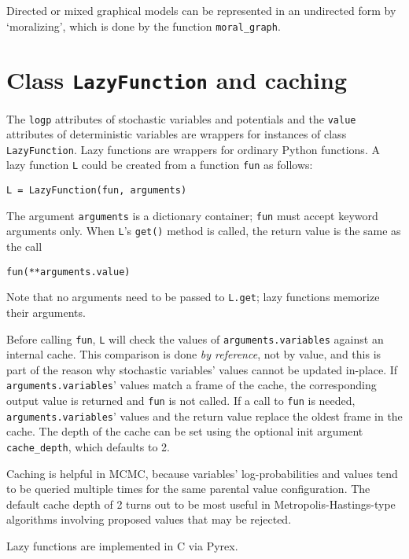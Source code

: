 Directed or mixed graphical models can be represented in an undirected form by `moralizing', which is done by the function \texttt{moral_graph}.


\section*{Class \texttt{LazyFunction} and caching}
\label{sec:caching} 

The \texttt{logp} attributes of stochastic variables and potentials and the \texttt{value} attributes of deterministic variables are wrappers for instances of class \texttt{LazyFunction}. Lazy functions are wrappers for ordinary Python functions. A lazy function \texttt{L} could be created from a function \texttt{fun} as follows:
\begin{verbatim}
L = LazyFunction(fun, arguments)
\end{verbatim}
The argument \texttt{arguments} is a dictionary container; \texttt{fun} must accept keyword arguments only. When \texttt{L}'s \texttt{get()} method is called, the return value is the same as the call 
\begin{verbatim}
fun(**arguments.value)
\end{verbatim}
Note that no arguments need to be passed to \texttt{L.get}; lazy functions memorize their arguments.

Before calling \texttt{fun}, \texttt{L} will check the values of \texttt{arguments.variables} against an internal cache. This comparison is done \emph{by reference}, not by value, and this is part of the reason why stochastic variables' values cannot be updated in-place. If \texttt{arguments.variables}' values match a frame of the cache, the corresponding output value is returned and \texttt{fun} is not called. If a call to \texttt{fun} is needed, \texttt{arguments.variables}' values and the return value replace the oldest frame in the cache. The depth of the cache can be set using the optional init argument \texttt{cache_depth}, which defaults to 2.

Caching is helpful in MCMC, because variables' log-probabilities and values tend to be queried multiple times for the same parental value configuration. The default cache depth of 2 turns out to be most useful in Metropolis-Hastings-type algorithms involving proposed values that may be rejected.

Lazy functions are implemented in C via Pyrex.